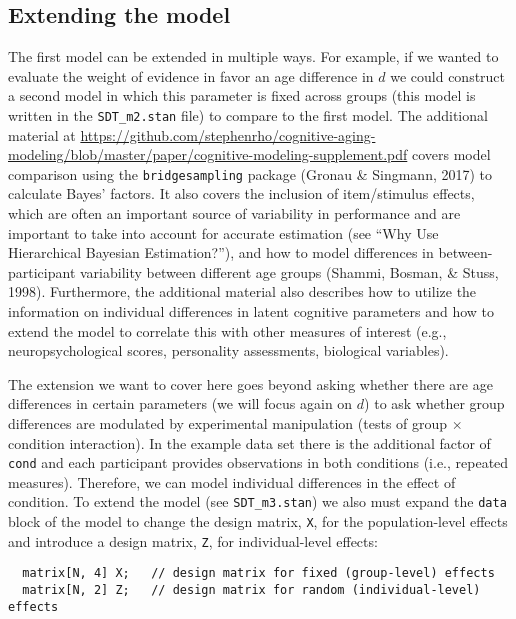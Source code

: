 \documentclass[
  english,
  ,man,floatsintext]{apa6}
\begin{document}
\hypertarget{extending-the-model}{%
\subsection{Extending the model}\label{extending-the-model}}

The first model can be extended in multiple ways. For example, if we wanted to evaluate the weight of evidence in favor an age difference in \(d\) we could construct a second model in which this parameter is fixed across groups (this model is written in the \texttt{SDT\_m2.stan} file) to compare to the first model. The additional material at \url{https://github.com/stephenrho/cognitive-aging-modeling/blob/master/paper/cognitive-modeling-supplement.pdf} covers model comparison using the \texttt{bridgesampling} package (Gronau \& Singmann, 2017) to calculate Bayes' factors. It also covers the inclusion of item/stimulus effects, which are often an important source of variability in performance and are important to take into account for accurate estimation (see \enquote{Why Use Hierarchical Bayesian Estimation?}), and how to model differences in between-participant variability between different age groups (Shammi, Bosman, \& Stuss, 1998). Furthermore, the additional material also describes how to utilize the information on individual differences in latent cognitive parameters and how to extend the model to correlate this with other measures of interest (e.g., neuropsychological scores, personality assessments, biological variables).

The extension we want to cover here goes beyond asking whether there are age differences in certain parameters (we will focus again on \(d\)) to ask whether group differences are modulated by experimental manipulation (tests of group \(\times\) condition interaction). In the example data set there is the additional factor of \texttt{cond} and each participant provides observations in both conditions (i.e., repeated measures). Therefore, we can model individual differences in the effect of condition. To extend the model (see \texttt{SDT\_m3.stan}) we also must expand the \texttt{data} block of the model to change the design matrix, \texttt{X}, for the population-level effects and introduce a design matrix, \texttt{Z}, for individual-level effects:

\begin{verbatim}
  matrix[N, 4] X;   // design matrix for fixed (group-level) effects
  matrix[N, 2] Z;   // design matrix for random (individual-level) effects
\end{verbatim}
\end{document}
